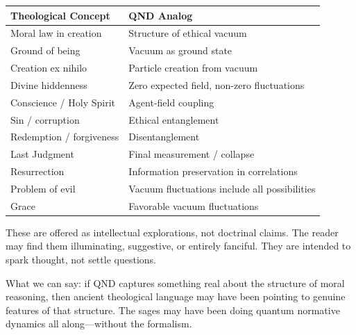 \documentclass[12pt]{article}
\begin{document}
\begin{table}[h]
\centering
\begin{tabular}{ll}
\toprule
\textbf{Theological Concept} & \textbf{QND Analog} \\
\midrule
Moral law in creation & Structure of ethical vacuum \\
Ground of being & Vacuum as ground state \\
Creation ex nihilo & Particle creation from vacuum \\
Divine hiddenness & Zero expected field, non-zero fluctuations \\
Conscience / Holy Spirit & Agent-field coupling \\
Sin / corruption & Ethical entanglement \\
Redemption / forgiveness & Disentanglement \\
Last Judgment & Final measurement / collapse \\
Resurrection & Information preservation in correlations \\
Problem of evil & Vacuum fluctuations include all possibilities \\
Grace & Favorable vacuum fluctuations \\
\bottomrule
\end{tabular}
\end{table}

These are offered as intellectual explorations, not doctrinal claims. The reader may find them illuminating, suggestive, or entirely fanciful. They are intended to spark thought, not settle questions.

What we can say: if QND captures something real about the structure of moral reasoning, then ancient theological language may have been pointing to genuine features of that structure. The sages may have been doing quantum normative dynamics all along---without the formalism.
\end{document}
